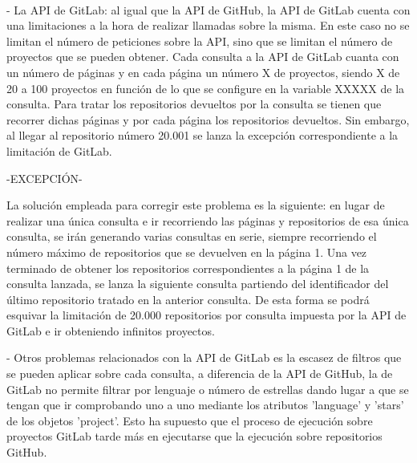 \\
	
- La API de GitLab: al igual que la API de GitHub, la API de GitLab cuenta con una limitaciones a la hora de realizar llamadas sobre la misma. En este caso no se limitan el número de peticiones sobre la API, sino que se limitan el número de proyectos que se pueden obtener.
Cada consulta a la API de GitLab cuanta con un número de páginas y en cada página un número X de proyectos, siendo X de 20 a 100 proyectos en función de lo que se configure en la variable XXXXX de la consulta. Para tratar los repositorios devueltos por la consulta se tienen que recorrer dichas páginas y por cada página los repositorios devueltos. Sin embargo, al llegar al repositorio número 20.001 se lanza la excepción correspondiente a la limitación de GitLab.

-EXCEPCIÓN-

La solución empleada para corregir este problema es la siguiente: en lugar de realizar una única consulta e ir recorriendo las páginas y repositorios de esa única consulta, se irán generando varias consultas en serie, siempre recorriendo el número máximo de repositorios que se devuelven en la página 1. Una vez terminado de obtener los repositorios correspondientes a la página 1 de la consulta lanzada, se lanza la siguiente consulta partiendo del identificador del último repositorio tratado en la anterior consulta. De esta forma se podrá esquivar la limitación de 20.000 repositorios por consulta impuesta por la API de GitLab e ir obteniendo infinitos proyectos.

- Otros problemas relacionados con la API de GitLab es la escasez de filtros que se pueden aplicar sobre cada consulta, a diferencia de la API de GitHub, la de GitLab no permite filtrar por lenguaje o número de estrellas dando lugar a que se tengan que ir comprobando uno a uno mediante los atributos 'language' y 'stars' de los objetos 'project'. Esto ha supuesto que el proceso de ejecución sobre proyectos GitLab tarde más en ejecutarse que la ejecución sobre repositorios GitHub.